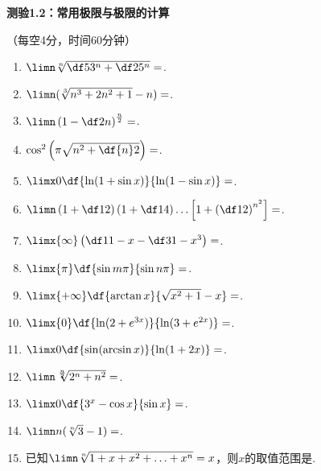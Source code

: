 
\begin{center}
	\Large\bf
	测验1.2：常用极限与极限的计算

	\kaishu\small （每空4分，时间60分钟）
\end{center}

\begin{enumerate}
	\item $\limn\sqrt[n]{\df5{3^n}+\df2{5^n}}=$\uline{\hspace*{3cm}}.
	\item $\limn(\sqrt[3]{n^3+2n^2+1}-n)=$\uline{\hspace*{3cm}}.
	\item $\limn\left(1-\df2n\right)^{\frac n2}=$\uline{\hspace*{3cm}}.
	\item $\cos^2\left(\pi\sqrt{n^2+\df{n}2}\right)=$\uline{\hspace*{3cm}}.
	\item $\limx0\df{\ln(1+\sin x)}{\ln(1-\sin x)}=$\uline{\hspace*{3cm}}.
	\item $\limn\left(1+\df12\right)\left(1+\df14\right)
	\ldots\left[1+\left(\df12\right)^{n^2}\right]=$\uline{\hspace*{3cm}}.
	\item $\limx{\infty}\left(\df1{1-x}-\df3{1-x^3}\right)=$\uline{\hspace*{3cm}}.
	\item $\limx{\pi}\df{\sin m\pi}{\sin n\pi}=$\uline{\hspace*{3cm}}.
	\item $\limx{+\infty}\df{\arctan x}{\sqrt{x^2+1}-x}=$\uline{\hspace*{3cm}}.
	\item $\limx{0}\df{\ln(2+e^{3x})}{\ln(3+e^{2x})}=$\uline{\hspace*{3cm}}.
	\item $\limx0\df{\sin(\arcsin x)}{\ln(1+2x)}=$\uline{\hspace*{3cm}}.
	\item $\limn\sqrt[\frac n2]{2^n+n^2}=$\uline{\hspace*{3cm}}.
	\item $\limx0\df{3^x-\cos x}{\sin x}=$\uline{\hspace*{3cm}}.
	\item $\limn n(\sqrt[n]{3}-1)=$\uline{\hspace*{3cm}}.
	\item 已知$\limn\sqrt[n]{1+x+x^2+\ldots+x^n}=x$，则$x$的取值范围是\uline{\hspace*{3cm}}.

\end{enumerate}
